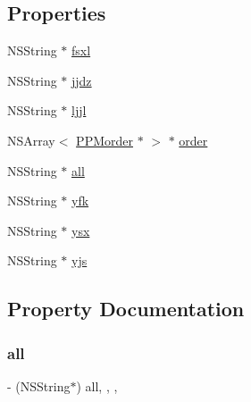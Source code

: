 \subsection*{Properties}
\begin{DoxyCompactItemize}
\item 
N\+S\+String $\ast$ \mbox{\hyperlink{interface_f_n_promote_public_model_aedb137391eb81c62b4a879b84171486f}{fsxl}}
\item 
N\+S\+String $\ast$ \mbox{\hyperlink{interface_f_n_promote_public_model_a373575bb3821909977a44285e27810aa}{jjdz}}
\item 
N\+S\+String $\ast$ \mbox{\hyperlink{interface_f_n_promote_public_model_a43d2d44eeae904745f6cd85d1c11d92b}{ljjl}}
\item 
N\+S\+Array$<$ \mbox{\hyperlink{interface_p_p_morder}{P\+P\+Morder}} $\ast$ $>$ $\ast$ \mbox{\hyperlink{interface_f_n_promote_public_model_aef1c1e129e9fcdaa120904a05023cf9a}{order}}
\item 
N\+S\+String $\ast$ \mbox{\hyperlink{interface_f_n_promote_public_model_ab1ae409fd04c74a4eb0068fe2f20c30a}{all}}
\item 
N\+S\+String $\ast$ \mbox{\hyperlink{interface_f_n_promote_public_model_af07daa8a54900bc04276e1d2402fc15a}{yfk}}
\item 
N\+S\+String $\ast$ \mbox{\hyperlink{interface_f_n_promote_public_model_a5c2dc188396c7ba3c48e8fbc81edf3bc}{ysx}}
\item 
N\+S\+String $\ast$ \mbox{\hyperlink{interface_f_n_promote_public_model_afa192afe3b2c2bc4b86b14dcc3d21a8b}{yjs}}
\end{DoxyCompactItemize}


\subsection{Property Documentation}
\mbox{\label{interface_f_n_promote_public_model_ab1ae409fd04c74a4eb0068fe2f20c30a}} 
\subsubsection{\texorpdfstring{all}{all}}
{\footnotesize\ttfamily -\/ (N\+S\+String$\ast$) all\hspace{0.3cm}{\ttfamily [read]}, {\ttfamily [write]}, {\ttfamily [nonatomic]}, {\ttfamily [copy]}}

